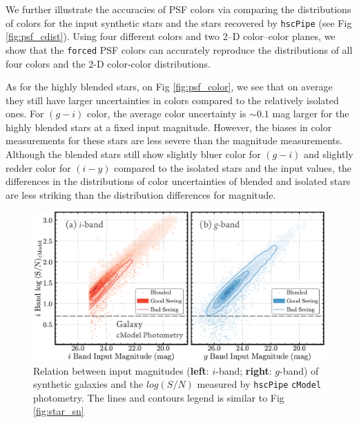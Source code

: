 \documentclass[useamsfonts]{pasj01}
\def\hscpipe{\texttt{hscPipe}}
\def\cmodel{\texttt{cModel}}
\def\forced{\texttt{forced}}
\begin{document}
    We further illustrate the accuracies of PSF colors via comparing the distributions
    of colors for the input synthetic stars and the stars recovered by \hscpipe{}
    (see Fig \ref{fig:psf_cdist}).
    Using four different colors and two 2--D color--color planes, we show that the \forced{}
    PSF colors can accurately reproduce the distributions of all four colors and the
    2-D color-color distributions.

    As for the highly blended stars, on Fig \ref{fig:psf_color}, we see that on average
    they still have larger uncertainties in colors compared to the relatively isolated
    ones.
    For $(g-i)$ color, the average color uncertainty is ${\sim}0.1$ mag larger for the
    highly blended stars at a fixed input magnitude.
    However, the biases in color measurements for these stars are less severe than
    the magnitude measurements.
    Although the blended stars still show slightly bluer color for $(g-i)$ and slightly redder color for $(i-y)$
    compared to the isolated stars and the input values, the differences in the
    distributions of color uncertainties of blended and isolated stars are less striking
    than the distribution differences for magnitude.


\begin{figure}
    \begin{center}
        \includegraphics[width=\textwidth]{fig/synpipe_galaxy_sn}
    \end{center}
    \caption{
        Relation between input magnitudes (\textbf{left}: $i$-band; \textbf{right}:
        $g$-band) of synthetic galaxies and the $log(S/N)$ measured by \hscpipe{}
        \cmodel{} photometry.
        The lines and contours legend is similar to Fig \ref{fig:star_sn}
        }
    \label{fig:cmodel_sn}
\end{figure}
\end{document}
